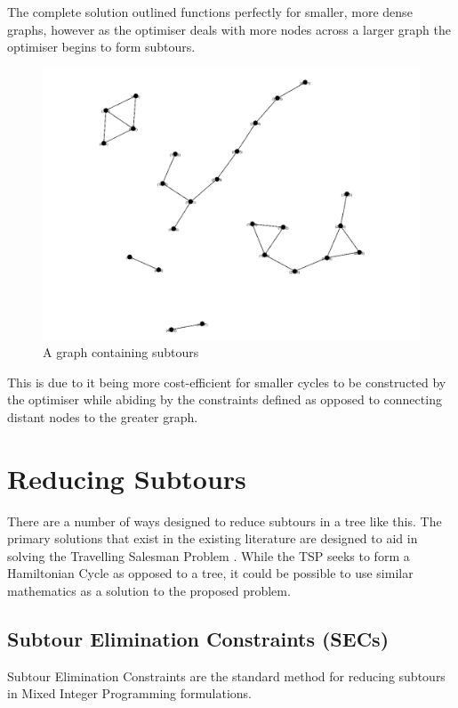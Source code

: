 The complete solution outlined functions perfectly for smaller, more dense graphs, however as the optimiser deals with more nodes across a larger graph the optimiser begins to form subtours.

\begin{figure}[H]
    \centering
    \includegraphics[width=0.35\linewidth]{subtours.png}
    \caption{A graph containing subtours}
    \label{fig:subtours}
\end{figure}

This is due to it being more cost-efficient for smaller cycles to be constructed by the optimiser while abiding by the constraints defined as opposed to connecting distant nodes to the greater graph.

\section{Reducing Subtours}
There are a number of ways designed to reduce subtours in a tree like this. The primary solutions that exist in the existing literature are designed to aid in solving the Travelling Salesman Problem \citep{Hoffman2013}. While the TSP seeks to form a Hamiltonian Cycle as opposed to a tree, it could be possible to use similar mathematics as a solution to the proposed problem.

\subsection{Subtour Elimination Constraints (SECs)}
Subtour Elimination Constraints are the standard method for reducing subtours in Mixed Integer Programming formulations. \citep{Clautiaux2025}
